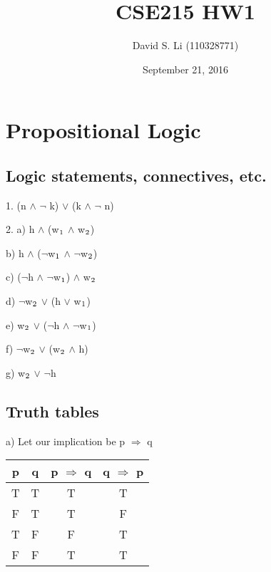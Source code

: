 \documentclass{article}
\title{CSE215 HW1}
\author{David S. Li (110328771)}
\date{September 21, 2016}
\begin{document}
\maketitle

\section{Propositional Logic}

\subsection{Logic statements, connectives, etc.}

1. (n $\wedge$ $\neg$ k) $\vee$ (k $\wedge$ $\neg$ n)

2. a) h $\wedge$ (w$\textsubscript{1}$ $\wedge$ w$\textsubscript{2}$) \par\noindent

   b) h $\wedge$ ($\neg$w$\textsubscript{1}$ $\wedge$ $\neg$w$\textsubscript{2}$) \par\noindent
   
   c) ($\neg$h $\wedge$ $\neg$w$\textsubscript{1}$) $\wedge$ w$\textsubscript{2}$ \par\noindent
   
   d) $\neg$w$\textsubscript{2}$ $\vee$ (h $\vee$ w$\textsubscript{1}$) \par\noindent
   
   e) w$\textsubscript{2}$ $\vee$ ($\neg$h $\wedge$ $\neg$w$\textsubscript{1}$) \par\noindent
   
   f) $\neg$w$\textsubscript{2}$ $\vee$ (w$\textsubscript{2}$ $\wedge$ h) \par\noindent
   
   g) w$\textsubscript{2}$ $\vee$ $\neg$h \par\noindent
   
   
\subsection{Truth tables}

    a) Let our implication be p $\Rightarrow$ q\par
    
    \begin{center}
    \begin{tabular}{||c c c c||}
    \hline
    p & q & p $\Rightarrow$ q & q $\Rightarrow$ p \\
    \hline \hline
    
         T & T & T & T \\
         \hline
         F & T & T & F \\ 
         \hline
         T & F & F & T \\
         \hline
         F & F & T & T \\
         \hline
         
         
    \end{tabular}
    \end{center}
    
\end{document}
